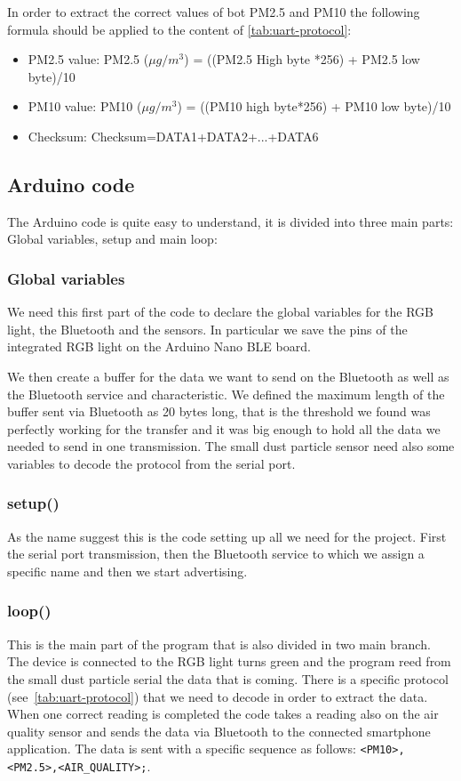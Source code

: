 \documentclass[12pt]{article}
\begin{document}
  In order to extract the correct values of bot PM2.5 and PM10 the following formula should be applied to the content of \autoref{tab:uart-protocol}:

  \begin{itemize}
    \item PM2.5 value: PM2.5 ($\mu g/m^3$)  =  ((PM2.5  High  byte  *256)  +  PM2.5 low byte)/10
    \item PM10 value: PM10 ($\mu g/m^3$)  =  ((PM10  high  byte*256)  +  PM10  low byte)/10
    \item Checksum: Checksum=DATA1+DATA2+...+DATA6
  \end{itemize}

  \subsection{Arduino code}
  The Arduino code is quite easy to understand, it is divided into three main parts: Global variables, setup and main loop:

  \subsubsection{Global variables}
  We need this first part of the code to declare the global variables for the RGB light, the Bluetooth and the sensors. In particular we save the pins of the integrated RGB light on the Arduino Nano BLE board.

  We then create a buffer for the data we want to send on the Bluetooth as well as the Bluetooth service and characteristic. We defined the maximum length of the buffer sent via Bluetooth as 20 bytes long, that is the threshold we found was perfectly working for the transfer and it was big enough to hold all the data we needed to send in one transmission.
  The small dust particle sensor need also some variables to decode the protocol from the serial port.

  \subsubsection{setup()}
  As the name suggest this is the code setting up all we need for the project. First the serial port transmission, then the Bluetooth service to which we assign a specific name and then we start advertising.

  \subsubsection{loop()}
  This is the main part of the program that is also divided in two main branch. The device is connected to the RGB light turns green and the program reed from the small dust particle serial the data that is coming. There is a specific protocol (see~\autoref{tab:uart-protocol}) that we need to decode in order to extract the data. When one correct reading is completed the code takes a reading also on the air quality sensor and sends the data via Bluetooth to the connected smartphone application. The data is sent with a specific sequence as follows: \verb|<PM10>,<PM2.5>,<AIR_QUALITY>;|.
\end{document}
